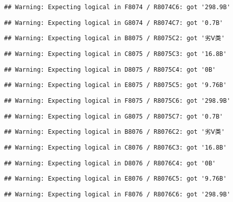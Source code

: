 \documentclass[
]{article}
\begin{document}
\begin{verbatim}
## Warning: Expecting logical in F8074 / R8074C6: got '298.9B'
\end{verbatim}

\begin{verbatim}
## Warning: Expecting logical in G8074 / R8074C7: got '0.7B'
\end{verbatim}

\begin{verbatim}
## Warning: Expecting logical in B8075 / R8075C2: got '劣Ⅴ类'
\end{verbatim}

\begin{verbatim}
## Warning: Expecting logical in C8075 / R8075C3: got '16.8B'
\end{verbatim}

\begin{verbatim}
## Warning: Expecting logical in D8075 / R8075C4: got '0B'
\end{verbatim}

\begin{verbatim}
## Warning: Expecting logical in E8075 / R8075C5: got '9.76B'
\end{verbatim}

\begin{verbatim}
## Warning: Expecting logical in F8075 / R8075C6: got '298.9B'
\end{verbatim}

\begin{verbatim}
## Warning: Expecting logical in G8075 / R8075C7: got '0.7B'
\end{verbatim}

\begin{verbatim}
## Warning: Expecting logical in B8076 / R8076C2: got '劣Ⅴ类'
\end{verbatim}

\begin{verbatim}
## Warning: Expecting logical in C8076 / R8076C3: got '16.8B'
\end{verbatim}

\begin{verbatim}
## Warning: Expecting logical in D8076 / R8076C4: got '0B'
\end{verbatim}

\begin{verbatim}
## Warning: Expecting logical in E8076 / R8076C5: got '9.76B'
\end{verbatim}

\begin{verbatim}
## Warning: Expecting logical in F8076 / R8076C6: got '298.9B'
\end{verbatim}
\end{document}
